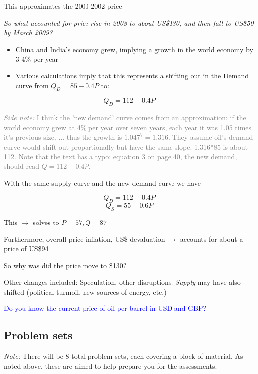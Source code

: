 \documentclass[]{article}
\begin{document}
This approximates the 2000-2002 price

\bigskip

\emph{So what accounted for price rise in 2008 to about US\$130, and then fall to US\$50 by March 2009?}

\begin{itemize}
\item
  China and India's economy grew, implying a growth in the world economy by 3-4\% per year
\item
  Various calculations imply that this represents a shifting out in the Demand curve from \(Q_D = 85 - 0.4P\) to:
\end{itemize}

\[Q_D = 112 - 0.4P\]

\textcolor{gray}{\emph{Side note:} I think the 'new demand' curve comes from an approximation:  if the world economy grew at 4\% per year over seven years, each year it was 1.05 times it's previous size. ... thus the growth is $1.047^7=1.316$.
They assume oil's demand curve would shift out proportionally but have the same slope. 1.316*85 is about 112.
Note that the text has a typo: equation 3 on page 40, the new demand, should read $Q=112-0.4P$.}

With the same supply curve and the new demand curve we have

\[Q_D = 112 - 0.4P\]
\[Q_S = 55 + 0.6P\]

This \(\rightarrow\) solves to \(P=57, Q=87\)

Furthermore, overall price inflation, US\$ devaluation \(\rightarrow\) accounts for about a price of US\$94

\bigskip

So why was did the price move to \$130?

Other changes included: Speculation, other disruptions. \emph{Supply} may have also shifted (political turmoil, new sources of energy, etc.)

\bigskip

\textcolor{blue}{Do you know the current price of oil per barrel in USD and GBP?}

\hypertarget{problem-sets}{%
\subsection{Problem sets}\label{problem-sets}}

\emph{Note:} There will be 8 total problem sets, each covering a block of material. As noted above, these are aimed to help prepare you for the assessments.
\end{document}
